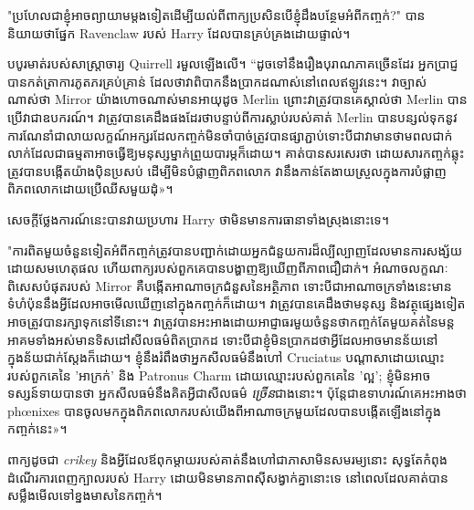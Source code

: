 "ប្រហែលជាខ្ញុំអាចព្យាយាមម្តងទៀតដើម្បីយល់ពីពាក្យប្រសិនបើខ្ញុំដឹងបន្ថែមអំពីកញ្ចក់?" បាននិយាយថាផ្នែក Ravenclaw របស់ Harry ដែលបានគ្រប់គ្រងដោយផ្ទាល់។

បបូរមាត់របស់សាស្រ្តាចារ្យ Quirrell រមួលឡើងលើ។ “ដូចទៅនឹងរឿងបុរាណភាគច្រើនដែរ អ្នកប្រាជ្ញបានកត់ត្រាការភូតភរគ្រប់គ្រាន់ ដែលថាវាពិបាកនឹងប្រាកដណាស់នៅពេលឥឡូវនេះ។ វាច្បាស់ណាស់ថា Mirror យ៉ាងហោចណាស់មានអាយុដូច Merlin ព្រោះវាត្រូវបានគេស្គាល់ថា Merlin បានប្រើវាជាឧបករណ៍។ វាត្រូវបានគេដឹងផងដែរថាបន្ទាប់ពីការស្លាប់របស់គាត់ Merlin បានបន្សល់ទុកនូវការណែនាំជាលាយលក្ខណ៍អក្សរដែលកញ្ចក់មិនចាំបាច់ត្រូវបានផ្សាភ្ជាប់ទោះបីជាវាមានថាមពលជាក់លាក់ដែលជាធម្មតាអាចធ្វើឱ្យមនុស្សម្នាក់ព្រួយបារម្ភក៏ដោយ។ គាត់បានសរសេរថា ដោយសារកញ្ចក់ឆ្លុះត្រូវបានបង្កើតយ៉ាងប៉ិនប្រសប់ ដើម្បីមិនបំផ្លាញពិភពលោក វានឹងកាន់តែងាយស្រួលក្នុងការបំផ្លាញពិភពលោកដោយប្រើឈីសមួយដុំ»។

សេចក្តីថ្លែងការណ៍នេះបានវាយប្រហារ Harry ថាមិនមានការធានាទាំងស្រុងនោះទេ។

"ការពិតមួយចំនួនទៀតអំពីកញ្ចក់ត្រូវបានបញ្ជាក់ដោយអ្នកជំនួយការដ៏ល្បីល្បាញដែលមានការសង្ស័យដោយសមហេតុផល ហើយពាក្យរបស់ពួកគេបានបង្ហាញឱ្យឃើញពីភាពជឿជាក់។ អំណាចលក្ខណៈពិសេសបំផុតរបស់ Mirror គឺបង្កើតអាណាចក្រជំនួសនៃអត្ថិភាព ទោះបីជាអាណាចក្រទាំងនេះមានទំហំប៉ុននឹងអ្វីដែលអាចមើលឃើញនៅក្នុងកញ្ចក់ក៏ដោយ។ វាត្រូវបានគេដឹងថាមនុស្ស និងវត្ថុផ្សេងទៀតអាចត្រូវបានរក្សាទុកនៅទីនោះ។ វាត្រូវបានអះអាងដោយអាជ្ញាធរមួយចំនួនថាកញ្ចក់តែមួយគត់នៃមន្តអាគមទាំងអស់មានទិសដៅសីលធម៌ពិតប្រាកដ ទោះបីជាខ្ញុំមិនប្រាកដថាអ្វីដែលអាចមានន័យនៅក្នុងន័យជាក់ស្តែងក៏ដោយ។ ខ្ញុំនឹងរំពឹងថាអ្នកសីលធម៌នឹងហៅ Cruciatus បណ្តាសាដោយឈ្មោះរបស់ពួកគេនៃ 'អាក្រក់' និង Patronus Charm ដោយឈ្មោះរបស់ពួកគេនៃ 'ល្អ'; ខ្ញុំមិនអាចទស្សន៍ទាយបានថា អ្នកសីលធម៌នឹងគិតអ្វីជាសីលធម៌ \emph{ច្រើន}ជាងនោះ។ ប៉ុន្តែ​ជា​ឧទាហរណ៍​គេ​អះអាង​ថា phœnixes បាន​ចូល​មក​ក្នុង​ពិភពលោក​របស់​យើង​ពី​អាណាចក្រ​មួយ​ដែល​បាន​បង្កើត​ឡើង​នៅ​ក្នុង​កញ្ចក់​នេះ»។

ពាក្យដូចជា \emph{crikey} និងអ្វីដែលឪពុកម្តាយរបស់គាត់នឹងហៅជាភាសាមិនសមរម្យនោះ សុទ្ធតែកំពុងដំណើរការពេញក្បាលរបស់ Harry ដោយមិនមានភាពស៊ីសង្វាក់គ្នានោះទេ នៅពេលដែលគាត់បានសម្លឹងមើលទៅខ្នងមាសនៃកញ្ចក់។

